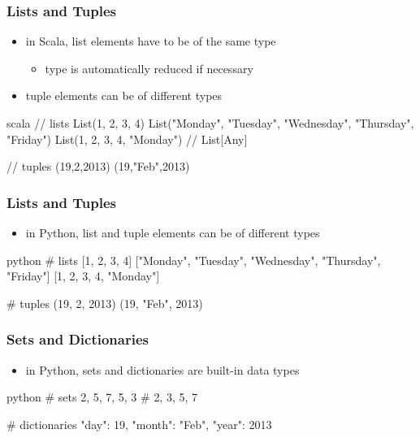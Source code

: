 \documentclass[dvipsnames]{beamer}
\theoremstyle{plain}
\begin{document}
\begin{frame}[fragile]
  \frametitle{Lists and Tuples}

  \begin{itemize}
    \item in Scala, list elements have to be of the same type
    \begin{itemize}
      \item type is automatically reduced if necessary
    \end{itemize}
    \item tuple elements can be of different types
  \end{itemize}

  \begin{example}[Scala]
    \begin{pygments}{scala}
// lists
List(1, 2, 3, 4)
List("Monday", "Tuesday", "Wednesday", "Thursday", "Friday")
List(1, 2, 3, 4, "Monday")  // List[Any]

// tuples
(19,2,2013)
(19,"Feb",2013)
    \end{pygments}
  \end{example}
\end{frame}

\begin{frame}[fragile]
  \frametitle{Lists and Tuples}

  \begin{itemize}
    \item in Python, list and tuple elements can be of different types
  \end{itemize}

  \begin{example}[Python]
    \begin{pygments}{python}
# lists
[1, 2, 3, 4]
["Monday", "Tuesday", "Wednesday", "Thursday", "Friday"]
[1, 2, 3, 4, "Monday"]

# tuples
(19, 2, 2013)
(19, "Feb", 2013)
    \end{pygments}
  \end{example}
\end{frame}

\begin{frame}[fragile]
  \frametitle{Sets and Dictionaries}

  \begin{itemize}
    \item in Python, sets and dictionaries are built-in data types
  \end{itemize}

  \begin{example}[Python]
    \begin{pygments}{python}
# sets
{2, 5, 7, 5, 3}         # {2, 3, 5, 7}

# dictionaries
{"day": 19, "month": "Feb", "year": 2013}
    \end{pygments}
  \end{example}
\end{frame}
\end{document}
